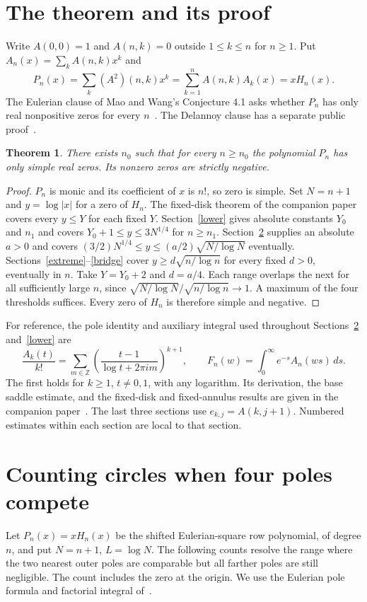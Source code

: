\documentclass[11pt]{article}
\newtheorem{theorem}{Theorem}
\begin{document}
\section{The theorem and its proof}
Write $A(0,0)=1$ and $A(n,k)=0$ outside $1\le k\le n$ for $n\ge1$. Put $A_n(x)=\sum_k A(n,k)x^k$ and
\[
 P_n(x)=\sum_k(A^2)(n,k)x^k=\sum_{k=1}^n A(n,k)A_k(x)=xH_n(x).
\]
The Eulerian clause of Mao and Wang's Conjecture 4.1 asks whether $P_n$ has only real nonpositive zeros for every $n$~\cite{MW}. The Delannoy clause has a separate public proof~\cite{public}.
\begin{theorem}
There exists $n_0$ such that for every $n\ge n_0$ the polynomial $P_n$ has only simple real zeros. Its nonzero zeros are strictly negative.
\end{theorem}
\begin{proof}
$P_n$ is monic and its coefficient of $x$ is $n!$, so zero is simple. Set $N=n+1$ and $y=\log|x|$ for a zero of $H_n$. The fixed-disk theorem of the companion paper~\cite[Theorem 2]{disk} covers every $y\le Y$ for each fixed $Y$. Section~\ref{lower} gives absolute constants $Y_0$ and $n_1$ and covers $Y_0+1\le y\le3N^{1/4}$ for $n\ge n_1$. Section~\ref{four} supplies an absolute $a>0$ and covers $(3/2)N^{1/4}\le y\le(a/2)\sqrt{N/\log N}$ eventually. Sections~\ref{extreme}--\ref{bridge} cover $y\ge d\sqrt{n/\log n}$ for every fixed $d>0$, eventually in $n$.
Take $Y=Y_0+2$ and $d=a/4$. Each range overlaps the next for all sufficiently large $n$, since $\sqrt{N/\log N}/\sqrt{n/\log n}\to1$. A maximum of the four thresholds suffices. Every zero of $H_n$ is therefore simple and negative.
\end{proof}
For reference, the pole identity and auxiliary integral used throughout Sections~\ref{four} and~\ref{lower} are
\[
 \frac{A_k(t)}{k!}=\sum_{m\in\mathbb Z}
 \left(\frac{t-1}{\log t+2\pi i m}\right)^{k+1},\qquad
 F_n(w)=\int_0^\infty e^{-s}A_n(ws)\,ds.
\]
The first holds for $k\ge1$, $t\ne0,1$, with any logarithm. Its derivation, the base saddle estimate, and the fixed-disk and fixed-annulus results are given in the companion paper~\cite{disk}. The last three sections use $e_{k,j}=A(k,j+1)$. Numbered estimates within each section are local to that section.

\section{Counting circles when four poles compete}\label{four}
Let $P_n(x)=xH_n(x)$ be the shifted Eulerian-square row polynomial, of degree $n$, and put $N=n+1$, $L=\log N$. The following counts resolve the range where the two nearest outer poles are comparable but all farther poles are still negligible. The count includes the zero at the origin. We use the Eulerian pole formula and factorial integral of~\cite{disk}.
\end{document}
